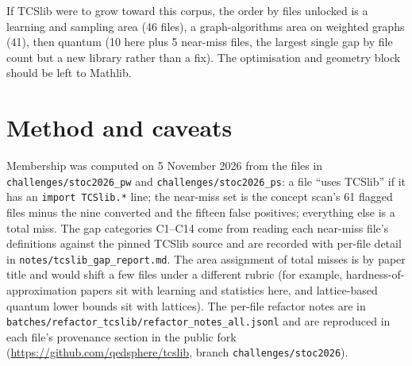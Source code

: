 \documentclass[11pt]{article}
\newcommand{\code}[1]{\texttt{#1}}
\begin{document}
If TCSlib were to grow toward this corpus, the order by files unlocked is a learning and
sampling area (46 files), a graph-algorithms area on weighted graphs (41), then quantum
(10 here plus 5 near-miss files, the largest single gap by file count but a new library rather
than a fix). The optimisation and geometry block should be left to Mathlib.

\section{Method and caveats}

Membership was computed on 5 November 2026 from the files in
\code{challenges/stoc2026\_pw} and \code{challenges/stoc2026\_ps}: a file ``uses TCSlib'' if it
has an \code{import TCSlib.*} line; the near-miss set is the concept scan's 61 flagged files
minus the nine converted and the fifteen false positives; everything else is a total miss. The
gap categories C1--C14 come from reading each near-miss file's definitions against the pinned
TCSlib source and are recorded with per-file detail in \code{notes/tcslib\_gap\_report.md}. The
area assignment of total misses is by paper title and would shift a few files under a different
rubric (for example, hardness-of-approximation papers sit with learning and statistics here, and
lattice-based quantum lower bounds sit with lattices). The per-file refactor notes are in
\code{batches/refactor\_tcslib/refactor\_notes\_all.jsonl} and are reproduced in each file's
provenance section in the public fork
(\url{https://github.com/qedsphere/tcslib}, branch \code{challenges/stoc2026}).
\end{document}
